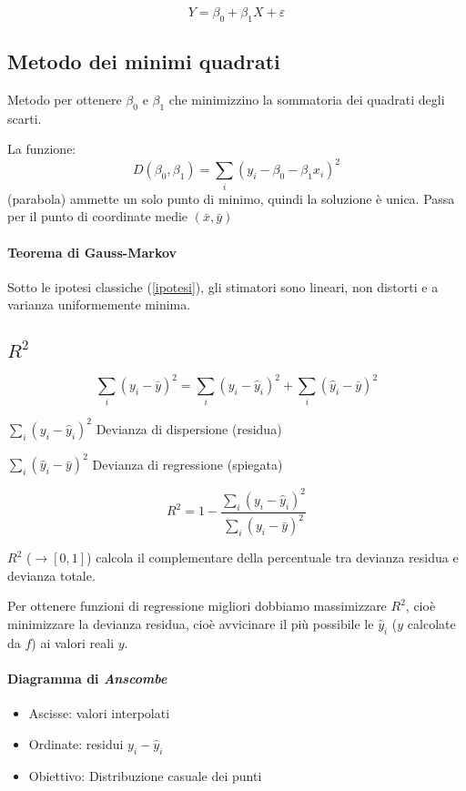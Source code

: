 \documentclass[11pt,onecolumn,a4paper,oneside]{book}
\begin{document}
$$Y = \beta_0 + \beta_1 X + \varepsilon$$

\subsection{Metodo dei minimi quadrati}
Metodo per ottenere $\beta_0$ e $\beta_1$ che minimizzino la sommatoria dei quadrati degli scarti.

La funzione:$$D(\beta_0, \beta_1) = \sum_i(y_i - \beta_0 - \beta_1 x_i)^2$$ (parabola) ammette un solo punto di minimo, quindi la soluzione è unica.
Passa per il punto di coordinate medie $(\bar x, \bar y )$

\paragraph{Teorema di Gauss-Markov}
Sotto le ipotesi classiche (\ref{ipotesi}), gli stimatori sono lineari, non distorti e a varianza uniformemente minima.

\subsection{$R^2$}
$$\sum_i (y_i - \bar y)^2 = \sum_i(y_i- \hat y_i) ^2 + \sum_i(\hat y_i- \bar y) ^2$$

$\sum_i(y_i - \hat y_i)^2$ Devianza di dispersione (residua)

$\sum_i(\hat y_i- \bar y) ^2$ Devianza di regressione (spiegata)

$$R^2 = 1- \frac{\sum_i(y_i-\hat y_i)^2}{\sum_i(y_i-\bar y)^2}$$

$R^2$ ($\rightarrow [0,1] $) calcola il complementare della percentuale tra devianza residua e devianza totale.

Per ottenere funzioni di regressione migliori dobbiamo massimizzare $R^2$, cioè minimizzare la devianza residua, cioè avvicinare il più possibile le $\hat y_i$ ($y$ calcolate da $f$) ai valori reali $y$.

\paragraph{Diagramma di \emph{Anscombe}}
\begin{itemize}
\item Ascisse: valori interpolati
\item Ordinate: residui $y_i - \hat y_i$
\item Obiettivo: Distribuzione casuale dei punti
\end{itemize}
\end{document}
